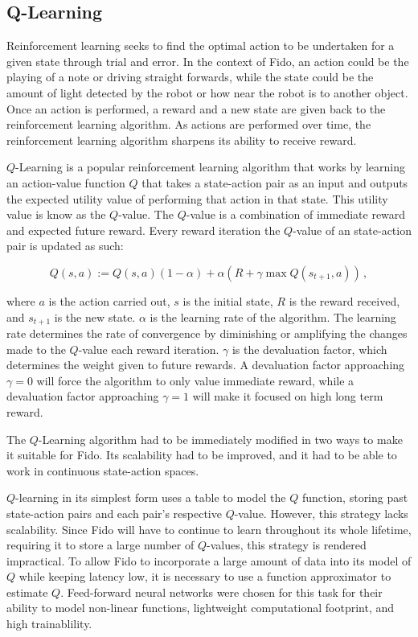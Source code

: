 \subsection{Q-Learning}

Reinforcement learning seeks to find the optimal action to be undertaken for a given state through trial and error. In the context of Fido, an action could be the playing of a note or driving straight forwards, while the state could be the amount of light detected by the robot or how near the robot is to another object. Once an action is performed, a reward and a new state are given back to the reinforcement learning algorithm.  As actions are performed over time, the reinforcement learning algorithm sharpens its ability to receive reward.

$Q$-Learning \cite{watkins} is a popular reinforcement learning algorithm that works by learning an action-value function $Q$ that takes a state-action pair as an input and outputs the expected utility value of performing that action in that state. This utility value is know as the $Q$-value. The $Q$-value is a combination of immediate reward and expected future reward. Every reward iteration the $Q$-value of an state-action pair is updated as such:

\begin{equation}
	Q(s, a) := Q(s, a)(1 - \alpha) + \alpha(R + \gamma \max Q(s_{t+1}, a))
	\,,
	\label{equ::updateqlearn}
\end{equation}

\noindent
where $a$ is the action carried out, $s$ is the initial state, $R$ is the reward received, and $s_{t+1}$ is the new state. $\alpha$ is the learning rate of the algorithm. The learning rate determines the rate of convergence by diminishing or amplifying the changes made to the $Q$-value each reward iteration. $\gamma$ is the devaluation factor, which determines the weight given to future rewards. A devaluation factor approaching $\gamma=0$ will force the algorithm to only value immediate reward, while a devaluation factor approaching $\gamma=1$ will make it focused on high long term reward.

The $Q$-Learning algorithm had to be immediately modified in two ways to make it suitable for Fido. Its scalability had to be improved, and it had to be able to work in continuous state-action spaces.

$Q$-learning in its simplest form uses a table to model the $Q$ function, storing past state-action pairs and each pair's respective $Q$-value.  However, this strategy lacks scalability. Since Fido will have to continue to learn throughout its whole lifetime, requiring it to store a large number of $Q$-values, this strategy is rendered impractical. To allow Fido to incorporate a large amount of data into its model of $Q$ while keeping latency low, it is necessary to use a function approximator to estimate $Q$.  Feed-forward neural networks were chosen for this task for their ability to model non-linear functions, lightweight computational footprint, and high trainablility.

